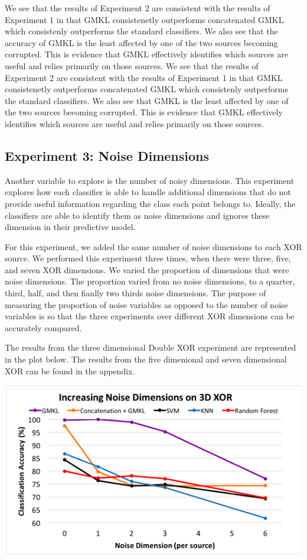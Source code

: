 \documentclass{article}
\begin{document}
We see that the results of Experiment 2 are consistent with the results of Experiment 1 in that GMKL consistenetly outperforms concatenated GMKL which consistenly outperforms the standard classifiers. We also see that the accuracy of GMKL is the least affected by one of the two sources becoming corrupted. This is evidence that GMKL effectively identifies which sources are useful and relies primarily on those sources. 
We see that the results of Experiment 2 are consistent with the results of Experiment 1 in that GMKL consistenetly outperforms concatenated GMKL which consistenly outperforms the standard classifiers. We also see that GMKL is the least affected by one of the two sources becoming corrupted. This is evidence that GMKL effectively identifies which sources are useful and relies primarily on those sources.



\subsection{Experiment 3: Noise Dimensions}

Another variable to explore is the number of noisy dimensions. This experiment explores how each classifier is able to handle additional dimensions that do not provide useful information regarding the class each point belongs to. Ideally, the classifiers are able to identify them as noise dimensions and ignores these dimension in their predictive model. 

For this experiment, we added the same number of noise dimensions to each XOR source. We performed this experiment three times, when there were three, five, and seven XOR dimensions. We varied the proportion of dimensions that were noise dimensions. The proportion varied from no noise dimensions, to a quarter, third, half, and then fianlly two thirds noise dimensions. The purpose of measuring the proportion of noise variables as opposed to the number of noise variables is so that the three experiments over different XOR dimensions can be accurately compared. 

The results from the three dimensional Double XOR experiment are represented in the plot below. The results from the five dimenional and seven dimensional XOR can be found in the appendix. 

\begin{center}
\includegraphics[scale=0.7]{Noise_Dim_line.png}
\end{center}
\end{document}

